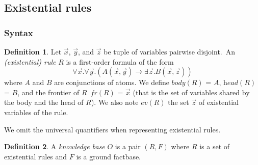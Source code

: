 \documentclass{article}
\theoremstyle{definition}
\newtheorem{definition}{Definition}[section]
\theoremstyle{remark}
\begin{document}



\subsection{Existential rules}

\subsubsection{Syntax}

\begin{definition}
Let $\vec x$, $\vec y$, and $\vec z$ be tuple of variables pairwise disjoint.\ An \emph{(existential) rule} $R$ is a first-order formula	of the form $$\forall \vec x.\forall \vec y.( A(\vec x,\vec y) \rightarrow \exists \vec z. B(\vec x,\vec z))$$ where $A$ and $B$ are conjunctions of atoms. We define \emph{$\textit{body}(R)$} = $A$, \emph{$\textit{head}(R)$} = $B$, and the frontier of $R$\ \emph{$\textit{fr}(R)$} = $\vec x$ (that is the set of variables shared by the body and the head of $R$). We also note \emph{$\textit{ev}(R)$} the set $\vec{z}$ of existential variables of the rule.
\end{definition}
We omit the universal quantifiers when representing existential rules.
\begin{definition}

A \emph{knowledge base} $O$ is a pair $(R,F)$ where $R$ is a set of existential rules and $F$ is a  ground factbase.
\end{definition}
\end{document}

